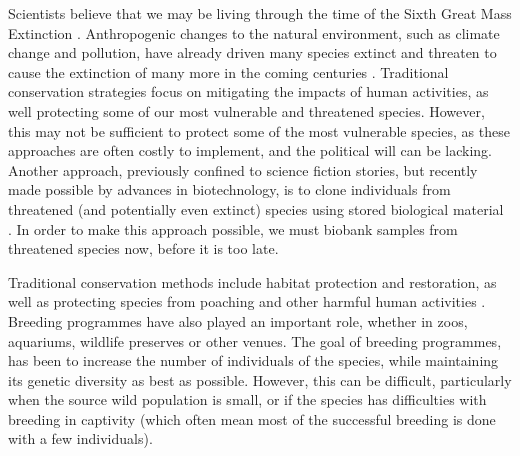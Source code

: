 \documentclass[12pt]{article}
\begin{document}
	Scientists believe that we may be living through the time of the Sixth 
	Great Mass Extinction \citep{barnoskyHasEarthSixth2011}. Anthropogenic changes to the natural environment, such 
	as climate change and pollution, have already driven many species extinct and 
	threaten to cause the extinction of many more in the coming centuries \citep{ceballosVertebratesBrinkIndicators2020}. 
	Traditional conservation strategies focus on mitigating the impacts of human
	activities, as well protecting some of our most vulnerable and 
	threatened species. However, this may not be sufficient to protect some of the most
	vulnerable species, as these approaches are often costly to implement, and 
	the political will can be lacking. Another approach, previously confined to
	science fiction stories, but recently made possible by advances in 
	biotechnology, is to clone individuals from threatened (and potentially even
	extinct) species using stored biological material \citep{loiGeneticRescueEndangered2001}. In order to make this approach possible, we must biobank samples from threatened species now, before it is too late.
	
	Traditional conservation methods include habitat
	protection and restoration, as well as protecting species from poaching and other
	harmful human activities \citep{mccarthyFinancialCostsMeeting2012}. Breeding programmes have also played an important role,
	whether in zoos, aquariums, wildlife preserves or other venues. The goal of breeding
	programmes, has been to increase the number of individuals of the species, while
	maintaining its genetic diversity as best as possible. However, this can be 
	difficult, particularly when the source wild population is small, or if the species has
	difficulties with breeding in captivity (which often mean most of the successful
	breeding is done with a few individuals).
	
\end{document}
